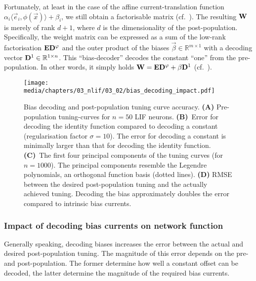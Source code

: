 Fortunately, at least in the case of the affine current-translation function $\alpha_i \langle \vec e_i, \phi(\vec x) \rangle + \beta_i$, we still obtain a factorisable matrix (cf.~).
The resulting $\mathbf{W}$ is merely of rank $d + 1$, where $d$ is the dimensionality of the post-population.
Specifically, the weight matrix can be expressed as a sum of the low-rank factorisation $\mathbf{E} \mathbf{D}^\varphi$ and the outer product of the biases $\vec \beta \in \mathbb{R}^{m \times 1}$ with a decoding vector $\mathbf{D}^1 \in \mathbb{R}^{1 \times n}$.
This \enquote{bias-decoder} decodes the constant \enquote{one} from the pre-population.
In other words, it simply holds $\mathbf{W} = \mathbf{E} \mathbf{D}^\varphi + \mathbf{\beta} \mathbf{D}^1$ (cf.~\cite[Chapter~4]{stockel2017point,duggins2017incorporating}).

\begin{figure}
	\texttt{[image: media/chapters/03\_nlif/03\_02/bias\_decoding\_impact.pdf]}%
	{\label{fig:bias_decoding_impact_a}}%
	{\label{fig:bias_decoding_impact_b}}%
	{\label{fig:bias_decoding_impact_c}}%
	{\label{fig:bias_decoding_impact_d}}%
	\caption[Bias decoding and post-population tuning curve accuracy]{Bias decoding and post-population tuning curve accuracy. \textbf{(A)} Pre-population tuning-curves for $n = 50$ LIF neurons.
	\textbf{(B)}~Error for decoding the identity function compared to decoding a constant (regularisation factor $\sigma = 10$). The error for decoding a constant is minimally larger than that for decoding the identity function.
	\textbf{(C)}~The first four principal components of the tuning curves (for $n = 1000$).
	The principal components resemble the Legendre polynomials, an orthogonal function basis (dotted lines).
	\textbf{(D)} RMSE between the desired post-population tuning and the actually achieved tuning. Decoding the bias approximately doubles the error compared to intrinsic bias currents.}
\end{figure}

\subsubsection{Impact of decoding bias currents on network function}
Generally speaking, decoding biases increases the error between the actual and desired post-population tuning.
The magnitude of this error depends on the pre- and post-population. 
The former determine how well a constant offset can be decoded, the latter determine the magnitude of the required bias currents.

